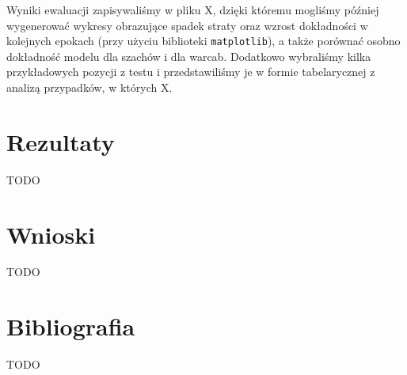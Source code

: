 \documentclass[12pt]{article}
\begin{document}
Wyniki ewaluacji zapisywaliśmy w pliku X, dzięki któremu mogliśmy później wygenerować wykresy obrazujące spadek straty oraz wzrost dokładności w kolejnych epokach (przy użyciu biblioteki \texttt{matplotlib}), a także porównać osobno dokładność modelu dla szachów i dla warcab. Dodatkowo wybraliśmy kilka przykładowych pozycji z testu i przedstawiliśmy je w formie tabelarycznej z analizą przypadków, w których X.


\section{Rezultaty}
TODO
\section{Wnioski}
TODO
\section{Bibliografia}
TODO
\end{document}
